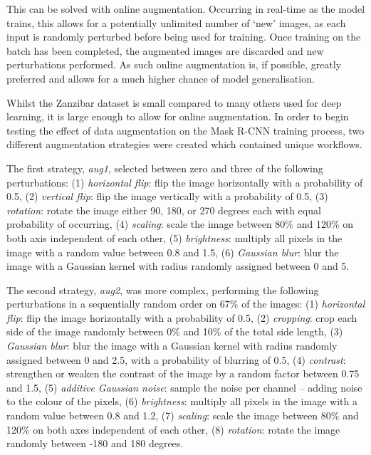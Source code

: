 This can be solved with online augmentation. Occurring in real-time as the model trains, this allows for a potentially unlimited number of `new' images, as each input is randomly perturbed before being used for training. Once training on the batch has been completed, the augmented images are discarded and new perturbations performed. As such online augmentation is, if possible, greatly preferred and allows for a much higher chance of model generalisation. 

Whilst the Zanzibar dataset is small compared to many others used for deep learning, it is large enough to allow for online augmentation. In order to begin testing the effect of data augmentation on the Mask R-CNN training process, two different augmentation strategies were created which contained unique workflows. 

The first strategy, \textit{aug1}, selected between zero and three of the following perturbations: (1) \textit{horizontal flip}: flip the image horizontally with a probability of 0.5, (2) \textit{vertical flip}: flip the image vertically with a probability of 0.5, (3) \textit{rotation}: rotate the image either 90, 180, or 270 degrees each with equal probability of occurring, (4) \textit{scaling}: scale the image between 80\% and 120\% on both axis independent of each other, (5) \textit{brightness}: multiply all pixels in the image with a random value between 0.8 and 1.5, (6) \textit{Gaussian blur}: blur the image with a Gaussian kernel with radius randomly assigned between 0 and  5. 

The second strategy, \textit{aug2}, was more complex, performing the following perturbations in a sequentially random order on 67\% of the images: (1) \textit{horizontal flip}: flip the image horizontally with a probability of 0.5, (2) \textit{cropping}: crop each side of the image randomly between 0\% and 10\% of the total side length, (3) \textit{Gaussian blur}: blur the image with a Gaussian kernel with radius randomly assigned between 0 and 2.5, with a probability of blurring of 0.5, (4) \textit{contrast}: strengthen or weaken the contrast of the image by a random factor between 0.75 and 1.5, (5) \textit{additive Gaussian noise}: sample the noise per channel -- adding noise to the colour of the pixels, (6) \textit{brightness}: multiply all pixels in the image with a random value between 0.8 and 1.2, (7) \textit{scaling}: scale the image between 80\% and 120\% on both axes independent of each other, (8) \textit{rotation}: rotate the image randomly between -180 and 180 degrees. 

